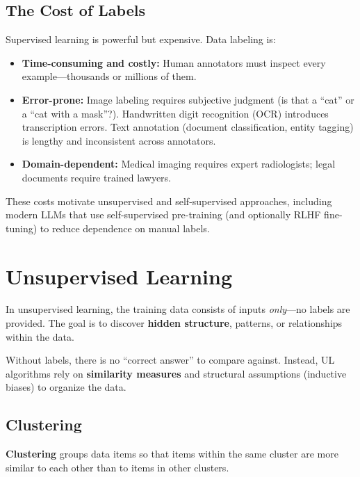 \subsection*{The Cost of Labels}

Supervised learning is powerful but expensive. Data labeling is:
\begin{itemize}
    \item \textbf{Time-consuming and costly:} Human annotators must inspect every example---thousands or millions of them.
    \item \textbf{Error-prone:} Image labeling requires subjective judgment (is that a ``cat'' or a ``cat with a mask''?). Handwritten digit recognition (OCR) introduces transcription errors. Text annotation (document classification, entity tagging) is lengthy and inconsistent across annotators.
    \item \textbf{Domain-dependent:} Medical imaging requires expert radiologists; legal documents require trained lawyers.
\end{itemize}

These costs motivate unsupervised and self-supervised approaches, including modern LLMs that use self-supervised pre-training (and optionally RLHF fine-tuning) to reduce dependence on manual labels.

\section*{Unsupervised Learning}

In unsupervised learning, the training data consists of inputs \emph{only}---no labels are provided.
The goal is to discover \textbf{hidden structure}, patterns, or relationships within the data.

\begin{remark}
Without labels, there is no ``correct answer'' to compare against. Instead, UL algorithms rely on \textbf{similarity measures} and structural assumptions (inductive biases) to organize the data.
\end{remark}

\subsection*{Clustering}

\textbf{Clustering} groups data items so that items within the same cluster are more similar to each other than to items in other clusters.

